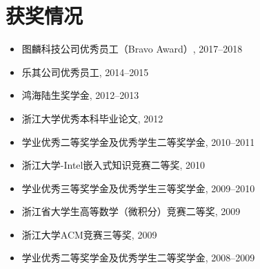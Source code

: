 \documentclass[letterpaper]{article}
\begin{document}
\section*{获奖情况}
\begin{itemize}
  \item 图麟科技公司优秀员工（Bravo Award）, 2017--2018
  \item 乐其公司优秀员工, 2014--2015
  \item 鸿海陆生奖学金, 2012--2013
  \item 浙江大学优秀本科毕业论文, 2012
  \item 学业优秀二等奖学金及优秀学生二等奖学金, 2010--2011
  \item 浙江大学-Intel嵌入式知识竞赛二等奖, 2010
  \item 学业优秀三等奖学金及优秀学生三等奖学金, 2009--2010
  \item 浙江省大学生高等数学（微积分）竞赛二等奖, 2009
  \item 浙江大学ACM竞赛三等奖, 2009
  \item 学业优秀二等奖学金及优秀学生二等奖学金, 2008--2009
\end{itemize}
\end{document}
